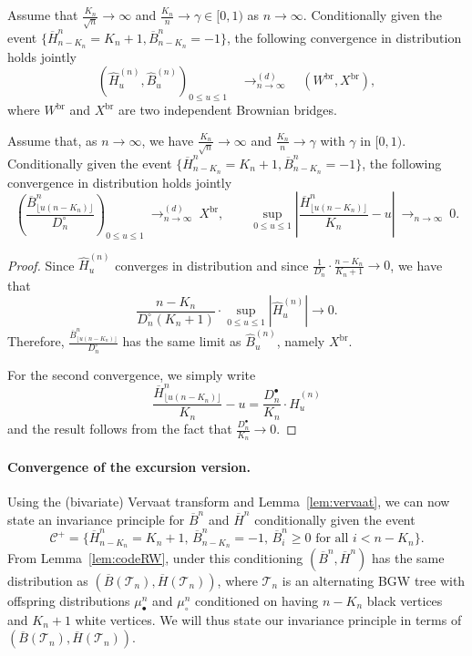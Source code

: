 \documentclass[10pt]{amsart}
\theoremstyle{definition}\newtheorem{defi}[theo]{Definition}\newtheorem{rema}[theo]{Remark}\newtheorem{exam}[theo]{Example}\newtheorem{exem}[theo]{Example}\newtheorem{nota}[theo]{Notation}
\def\mubn{\mu_{\bullet}^{n}}
\def\mucn{\mu_{\circ}^{n}}
\def\Dbn{D^{\bullet}_{n}}
\def\Dcn{D^{\circ}_{n}}
\def\oB{\overline{B}}
\def\hB{\widehat{B}}
\def\oH{\overline{H}}
\def\hH{\widehat{H}}
\def \Xbr{X^{\mathrm{br}}}
\def\Ts{\mathscr{T}}
\begin{document}
\begin{lemma}Assume that $\frac{K_{n}}{\sqrt{n}} \rightarrow   \infty$ and   $\tfrac{K_{n}}{n}  \rightarrow \gamma \in [0,1)$ as $n \rightarrow \infty$. Conditionally given the event
$ \{\oH^{n}_{n-K_{n}}=K_{n}+1, \oB^{n}_{n-K_{n}}=-1 \}$, the following  convergence in distribution holds jointly
\[  \left(  \hH^{(n)}_{u},  \hB^{(n)}_{u} \right)_{0 \leq u \leq 1}  \quad \mathop{\longrightarrow}^{(d)}_{n \rightarrow \infty} \quad (W^{\mathrm{br}},\Xbr),\]
where $W^{\mathrm{br}}$ and $\Xbr$ are two independent Brownian bridges.
\end{lemma}


\begin{corollary}\label{cor:cvjointe}
Assume that, as $n\rightarrow \infty$, we have $\frac{K_{n}}{\sqrt{n}} \rightarrow   \infty$ and   $\tfrac{K_{n}}{n}  \rightarrow \gamma$
with $\gamma$ in $[0,1)$. Conditionally given the event
$ \{\oH^{n}_{n-K_{n}}=K_{n}+1, \oB^{n}_{n-K_{n}}=-1 \}$, the following  convergence in distribution holds jointly
\[\left(  \frac{\oB^{n}_{ \lfloor u (n-K_{n}) \rfloor }}{\Dcn} \right)_{0 \leq u \leq 1}  \ \mathop{\longrightarrow}^{(d)}_{n \rightarrow \infty} \  \Xbr,  \qquad  \sup_{0 \leq u \leq 1} \left|   \frac{\oH^{n}_{ \lfloor u (n-K_{n}) \rfloor }}{K_{n}}-u\right|  \ \mathop{\longrightarrow}_{n \rightarrow \infty} \ 0.\]
\end{corollary}


\begin{proof}
  Since $  \hH^{(n)}_{u}$
  converges in distribution and since $ \frac{1}{\Dcn} \cdot \frac{n-K_{n}}{K_{n}+1} \rightarrow 0$, we have that
\[  \frac{n-K_{n}}{\Dcn(K_{n}+1)} \cdot \sup_{0 \leq u \leq 1}| \hH^{(n)}_{u}| \rightarrow 0.\]
Therefore, $\frac{\oB^{n}_{ \lfloor u (n-K_{n}) \rfloor }}{\Dcn}$
has the same limit as $\hB^{(n)}_{u}$, namely $\Xbr$.

For the second convergence, we simply write
\[\frac{\oH^{n}_{ \lfloor u (n-K_{n}) \rfloor }}{K_{n}}-u= \frac{\Dbn}{K_{n}} \cdot \hH^{(n)}_{u}\]
and the result follows from the fact that $ \frac{\Dbn}{K_{n}} \rightarrow 0$.
\end{proof}


\paragraph*{Convergence of the excursion version.}

Using the (bivariate) Vervaat transform and Lemma~\ref{lem:vervaat},
we can now state an invariance principle for $\oB^{n}$ and $\oH^{n}$
conditionally given the event
\[\mathcal C^+=\{\oH^{n}_{n-K_{n}}=K_{n}+1,\, \oB^{n}_{n-K_{n}}=-1,\, \oB^{n}_i \ge 0\text{ for all }i <n-K_n \}.\]
From Lemma~\ref{lem:codeRW},
under this conditioning $(\oB^{n}, \oH^{n})$ has the same distribution
as $(\oB(\Ts_n),\oH(\Ts_n))$,
where $\Ts_n$ is an alternating BGW tree with offspring distributions $\mubn$ and $\mucn$
conditioned on having $n-K_n$ black vertices and $K_n+1$ white vertices.
We will thus state our invariance principle in terms of $(\oB(\Ts_n),\oH(\Ts_n))$.
\end{document}
